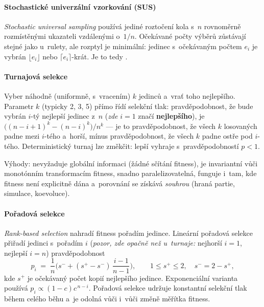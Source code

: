 \documentclass[11pt,a4paper]{article}
\theoremstyle{definition}
\begin{document}
\paragraph{Stochastické univerzální vzorkování (SUS)}

\emph{Stochastic universal sampling} používá jediné roztočení kola s~$n$
rovnoměrně rozmístěnými ukazateli vzdálenými o~$1/n$. Očekávané počty výběrů
zůstávají stejné jako u~rulety, ale rozptyl je minimální: jedinec s~očekávaným
počtem $e_i$ je vybrán $\lfloor e_i \rfloor$ nebo $\lceil e_i \rceil$-krát.
Je to tedy .

\paragraph{Turnajová selekce}

\begin{defbox}
Vyber náhodně (uniformně, s~vracením) $k$ jedinců a~vrať toho nejlepšího.
Parametr $k$ (typicky 2, 3, 5) přímo řídí selekční tlak: pravděpodobnost, že
bude vybrán $i$-tý nejlepší jedinec z~$n$ (\emph{zde} $i=1$ značí
\textbf{nejlepšího}), je
$\big((n-i+1)^k - (n-i)^k\big)/n^k$ --- je to pravděpodobnost, že všech $k$
losovaných padne mezi $i$-tého a~horší, mínus pravděpodobnost, že všech $k$
padne ostře pod $i$-tého. Deterministický turnaj lze změkčit:
lepší vyhraje s~pravděpodobností $p < 1$.
\end{defbox}

Výhody: nevyžaduje globální informaci (žádné sčítání fitness), je invariantní
vůči monotónním transformacím fitness, snadno paralelizovatelná, funguje i~tam,
kde fitness není explicitně dána a~porovnání se získává \emph{souhrou}
(hraná partie, simulace, koevoluce).

\paragraph{Pořadová selekce}

\emph{Rank-based selection} nahradí fitness pořadím jedince. Lineární pořadová
selekce přiřadí jedinci s~pořadím $i$ (\emph{pozor, zde opačně než u~turnaje:}
nejhorší $i=1$, nejlepší $i=n$)
pravděpodobnost
\[
p_i \;=\; \frac{1}{n}\Big(s^{-} + (s^{+}-s^{-})\,\frac{i-1}{n-1}\Big),
\qquad 1 \le s^{+} \le 2,\quad s^{-} = 2 - s^{+},
\]
kde $s^{+}$ je očekávaný počet kopií nejlepšího jedince. Exponenciální varianta
používá $p_i \propto (1-c)c^{\,n-i}$. Pořadová selekce udržuje konstantní
selekční tlak během celého běhu a~je odolná vůči 
i~vůči změně měřítka fitness.
\end{document}
